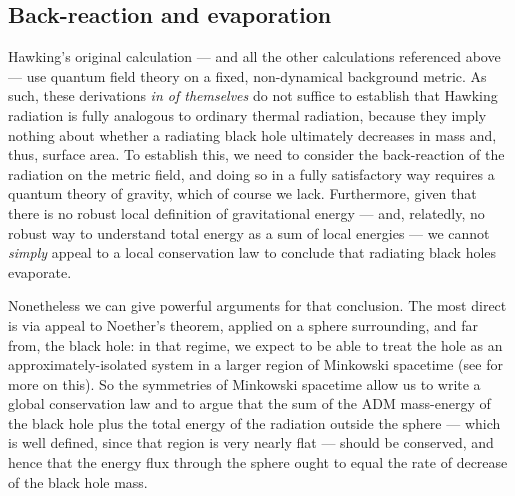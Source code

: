 \documentclass[12pt]{article}
\begin{document}
 \subsection{Back-reaction and evaporation}\label{backreaction}
 
Hawking's original calculation ---  and all the other calculations referenced above --- use quantum field theory on a fixed, non-dynamical background metric. As such, these derivations \emph{in of themselves} do not suffice to establish that Hawking radiation is fully analogous to ordinary thermal radiation, because they imply nothing about whether a radiating black hole ultimately decreases in mass and, thus, surface area. To establish this, we need to consider the back-reaction of the radiation on the metric field, and doing so in a fully satisfactory way requires a quantum theory of gravity, which of course we lack. Furthermore, given that there is no robust local definition of gravitational energy --- and, relatedly, no robust way to understand total energy as a sum of local energies --- we cannot \emph{simply} appeal to a local conservation law to conclude that radiating black holes evaporate.

Nonetheless we can give powerful arguments for that conclusion. The most direct is via appeal to Noether's theorem, applied on a sphere surrounding, and far from, the black hole: in that regime, we expect to be able to treat the hole as an approximately-isolated system in a larger region of Minkowski spacetime (see  for more on this). So the symmetries of Minkowski spacetime allow us to write a global conservation law and to argue that the sum of the ADM mass-energy of the black hole plus the total energy of the radiation outside the sphere --- which is well defined, since that region is very nearly flat --- should be conserved, and hence that the energy flux through the sphere ought to equal the rate of decrease of the black hole mass.
\end{document}
